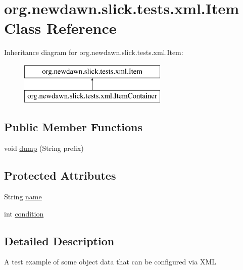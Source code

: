 \hypertarget{classorg_1_1newdawn_1_1slick_1_1tests_1_1xml_1_1_item}{}\section{org.\+newdawn.\+slick.\+tests.\+xml.\+Item Class Reference}
\label{classorg_1_1newdawn_1_1slick_1_1tests_1_1xml_1_1_item}
Inheritance diagram for org.\+newdawn.\+slick.\+tests.\+xml.\+Item\+:\begin{figure}[H]
\begin{center}
\leavevmode
\includegraphics[height=2.000000cm]{classorg_1_1newdawn_1_1slick_1_1tests_1_1xml_1_1_item}
\end{center}
\end{figure}
\subsection*{Public Member Functions}
\begin{DoxyCompactItemize}
\item 
void \mbox{\hyperlink{classorg_1_1newdawn_1_1slick_1_1tests_1_1xml_1_1_item_a2a3b9188cb3353e8451c5df71c783e5a}{dump}} (String prefix)
\end{DoxyCompactItemize}
\subsection*{Protected Attributes}
\begin{DoxyCompactItemize}
\item 
String \mbox{\hyperlink{classorg_1_1newdawn_1_1slick_1_1tests_1_1xml_1_1_item_a5bbf1293e61bcd4d8c543caae4e3c967}{name}}
\item 
int \mbox{\hyperlink{classorg_1_1newdawn_1_1slick_1_1tests_1_1xml_1_1_item_a17a71d3cab0191fbd90b875a6483efea}{condition}}
\end{DoxyCompactItemize}


\subsection{Detailed Description}
A test example of some object data that can be configured via X\+ML

